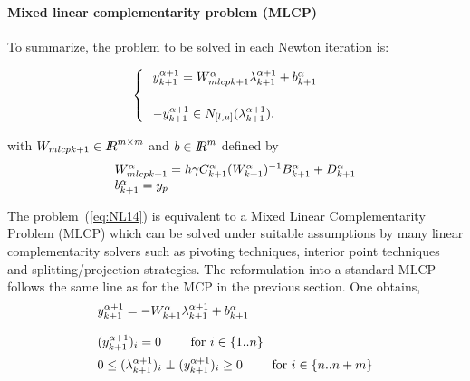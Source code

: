 \paragraph{Mixed linear complementarity problem (MLCP)}To summarize, the problem to be solved in each Newton iteration is:\\{
  \begin{minipage}[l]{1.0\linewidth}
    \begin{equation}
      \begin{cases}
      \begin{array}[l]{l}
        y^{\alpha+1}_{k+1} =   W_{mlcpk+1}^{\alpha}  \lambda^{\alpha+1}_{k+1} + b^{\alpha}_{k+1}
        \\ \\
        -y^{\alpha+1}_{k+1} \in N_{[l,u]}(\lambda^{\alpha+1}_{k+1} ).
      \end{array}
      \label{eq:NL14}
      \end{cases}
    \end{equation}
  \end{minipage}
}
with $W_{mlcpk+1}\in \mbox{\rm $I\!\!R$}^{m\times m}$ and $b\in\mbox{\rm $I\!\!R$}^{m}$ defined by
\begin{equation}
  \label{eq:NL15}
 \begin{array}[l]{l}
   W_{mlcpk+1}^{\alpha} = h \gamma C^{\alpha}_{k+1}  (W^{\alpha}_{k+1})^{-1}  B^{\alpha}_{k+1} + D^{\alpha}_{k+1} \\
   b^{\alpha}_{k+1} = y_p
\end{array}
\end{equation}

The problem~(\ref{eq:NL14}) is equivalent to a Mixed Linear Complementarity Problem (MLCP) which can be solved under suitable assumptions by many linear complementarity solvers such as pivoting techniques, interior point techniques and splitting/projection strategies. The  reformulation into a standard MLCP follows the same line as for the MCP in the previous section. One obtains,
    \begin{equation}
      \begin{array}[l]{l}
        y^{\alpha+1}_{k+1} =   - W^{\alpha}_{k+1}  \lambda^{\alpha+1}_{k+1} + b^{\alpha}_{k+1}
        \\ \\
        (y^{\alpha+1}_{k+1})_i  = 0 \qquad \textrm{ for } i \in \{ 1..n\}\\[2mm]
        0 \leq  (\lambda^{\alpha+1}_{k+1})_i\perp (y^{\alpha+1}_{k+1})_i \geq 0 \qquad \textrm{ for } i \in \{ n..n+m\}\\
      \end{array}
      \label{eq:MLCP1}
    \end{equation}




